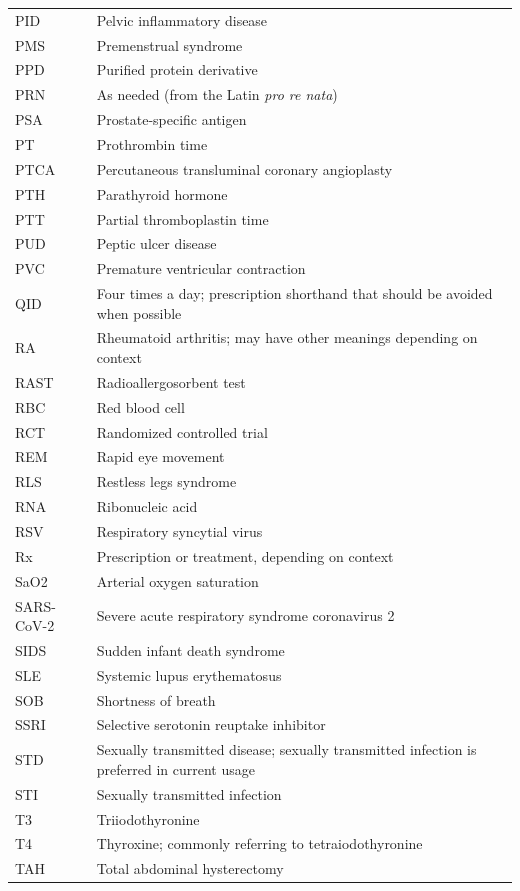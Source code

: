\begin{longtable}{>{\raggedright\arraybackslash}p{} >{\raggedright\arraybackslash}p{}}
PID & Pelvic inflammatory disease \\
PMS & Premenstrual syndrome \\
PPD & Purified protein derivative \\
PRN & As needed (from the Latin \textit{pro re nata}) \\
PSA & Prostate-specific antigen \\
PT & Prothrombin time \\
PTCA & Percutaneous transluminal coronary angioplasty \\
PTH & Parathyroid hormone \\
PTT & Partial thromboplastin time \\
PUD & Peptic ulcer disease \\
PVC & Premature ventricular contraction \\
QID & Four times a day; prescription shorthand that should be avoided when possible \\
RA & Rheumatoid arthritis; may have other meanings depending on context \\
RAST & Radioallergosorbent test \\
RBC & Red blood cell \\
RCT & Randomized controlled trial \\
REM & Rapid eye movement \\
RLS & Restless legs syndrome \\
RNA & Ribonucleic acid \\
RSV & Respiratory syncytial virus \\
Rx & Prescription or treatment, depending on context \\
SaO2 & Arterial oxygen saturation \\
SARS-CoV-2 & Severe acute respiratory syndrome coronavirus 2 \\
SIDS & Sudden infant death syndrome \\
SLE & Systemic lupus erythematosus \\
SOB & Shortness of breath \\
SSRI & Selective serotonin reuptake inhibitor \\
STD & Sexually transmitted disease; sexually transmitted infection is preferred in current usage \\
STI & Sexually transmitted infection \\
T3 & Triiodothyronine \\
T4 & Thyroxine; commonly referring to tetraiodothyronine \\
TAH & Total abdominal hysterectomy \\

\end{longtable}
